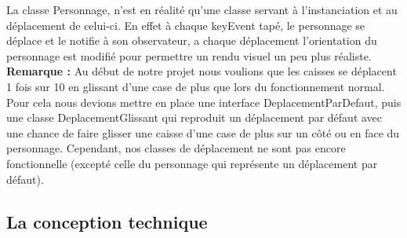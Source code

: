 \documentclass[a4paper,12pt]{article} %
\begin{document}
\newline
La classe Personnage, n’est en réalité qu’une classe servant à l’instanciation et au déplacement de celui-ci. En effet à chaque keyEvent tapé, le personnage se déplace et le notifie à son observateur, a chaque déplacement l’orientation du personnage est modifié pour permettre un rendu visuel un peu plus réaliste.
\newline\newline
\textbf{Remarque :}
\newline\newline
Au début de notre projet nous voulions que les caisses se déplacent 1 fois sur 10 en glissant d’une case de plus que lors du fonctionnement normal. Pour cela nous devions mettre en place une interface DeplacementParDefaut, puis une classe DeplacementGlissant qui reproduit un déplacement par défaut avec une chance de faire glisser une caisse d’une case de plus sur un côté ou en face du personnage. Cependant, nos classes de déplacement ne sont pas encore fonctionnelle (excepté celle du personnage qui représente un déplacement par défaut).
\newpage


\subsection{La conception technique} 
\end{document}
